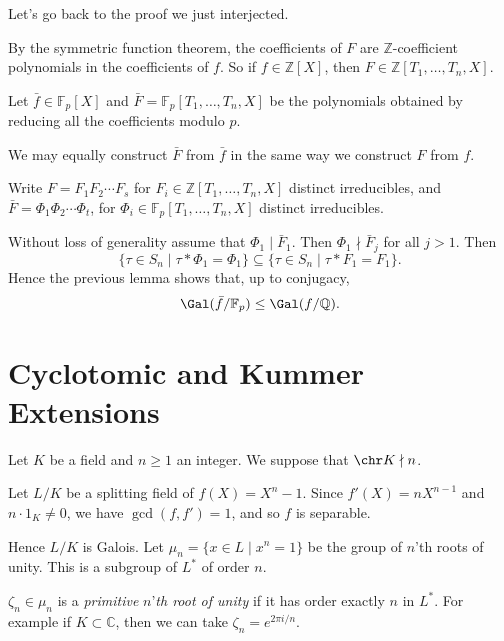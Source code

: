 \documentclass[12pt]{article}
\begin{document}
Let's go back to the proof we just interjected.

\begin{proofbox}
	By the symmetric function theorem, the coefficients of $F$ are $\mathbb{Z}$-coefficient polynomials in the coefficients of $f$. So if $f \in \mathbb{Z}[X]$, then $F \in \mathbb{Z}[T_1, \ldots, T_n, X]$.

	Let $\bar f \in \mathbb{F}_p[X]$ and $\bar F = \mathbb{F}_p[T_1, \ldots, T_n, X]$ be the polynomials obtained by reducing all the coefficients modulo $p$.

	We may equally construct $\bar F$ from $\bar f$ in the same way we construct $F$ from $f$.

	Write $F = F_1 F_2 \cdots F_s$ for $F_i \in \mathbb{Z}[T_1, \ldots, T_n, X]$ distinct irreducibles, and $\bar F = \Phi_1 \Phi_2 \cdots \Phi_t$, for $\Phi_i \in \mathbb{F}_p[T_1, \ldots, T_n, X]$ distinct irreducibles.

	Without loss of generality assume that $\Phi_1 \mid \bar F_1$. Then $\Phi_1 \nmid \bar F_j$ for all $j > 1$. Then
	\[
		\{ \tau \in S_n \mid \tau \ast \Phi_1 = \Phi_1\} \subseteq \{\tau \in S_n \mid \tau \ast F_1 = F_1\}.
	\]
	Hence the previous lemma shows that, up to conjugacy,
	\[
	\Gal(\bar f/ \mathbb{F}_p) \leq \Gal(f / \mathbb{Q}).
	\]
\end{proofbox}

\newpage

\section{Cyclotomic and Kummer Extensions}
\label{sec:cyc_kum}

Let $K$ be a field and $n \geq 1$ an integer. We suppose that $\chr K \nmid n$.

Let $L/K$ be a splitting field of $f(X) = X^n  - 1$. Since $f'(X) = n X^{n-1}$ and $n \cdot 1_K \neq 0$, we have $\gcd(f, f') = 1$, and so $f$ is separable.

Hence $L/K$ is Galois. Let $\mu_n = \{x \in L \mid x^n = 1\}$ be the group of $n$'th roots of unity. This is a subgroup of $L^{\ast}$ of order $n$.

\begin{definition}
$\zeta_n \in \mu_n$ is a \emph{primitive} $n$'\emph{th root of unity} if it has order exactly $n$ in $L^{\ast}$. For example if $K \subset \mathbb{C}$, then we can take $\zeta_n = e^{2 \pi i/n}.$
\end{definition}
\end{document}
